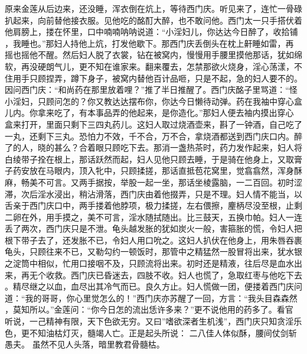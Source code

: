 原来金莲从后边来，还没睡，浑衣倒在炕上，等待西门庆。听见来了，连忙一骨碌
扒起来，向前替他接衣服。见他吃的酩酊大醉，也不敢问他。西门太一只手搭伏着
他肩膀上，搂在怀里，口中喃喃呐呐说道：“小淫妇儿，你达达今日醉了，收拾铺
，我睡也。”那妇人持他上炕，打发他歇下。那西门庆丢倒头在枕上鼾睡如雷，再
摇也摇他不醒。然后妇人脱了衣裳，钻在被窝内，慢慢用手腰里摸他那话，犹如绵
软，再没硬朗气儿，更不知在谁家来。翻来覆去，怎禁那欲火烧身，淫心荡漾，不
住用手只顾捏弄，蹲下身子，被窝内替他百计品咂，只是不起，急的妇人要不的。
因问西门庆：“和尚药在那里放着哩？”推了半日推醒了。西门庆酩子里骂道：“怪
小淫妇，只顾问怎的？你又教达达摆布你，你达今日懒待动弹。药在我袖中穿心盒
儿内。你拿来吃了，有本事品弄的他起来，是你造化。”那妇人便去袖内摸出穿心
盒来打开，里面只剩下三四丸药儿。这妇人取过烧酒壶来，斟了一钟酒，自己吃了
一丸，还剩下三丸。恐怕力不效，千不合，万不合，拿烧酒都送到西门庆口内。醉
了的人，晓的甚么？合着眼只顾吃下去。那消一盏热茶时，药力发作起来，妇人将
白绫带子拴在根上，那话跃然而起，妇人见他只顾去睡，于是骑在他身上，又取膏
子药安放在马眼内，顶入牝中，只顾揉搓，那话直抵苞花窝里，觉翕翕然，浑身酥
麻，畅美不可言。又两手据按，举股一起一坐，那话坐棱露脑，一二百回。初时涩
滞，次后淫水浸出，稍沾滑落，西门庆由着他掇弄，只是不理。妇人情不能当，以
舌亲于西门庆口中，两手搂着他脖项，极力揉搓，左右偎擦，麈柄尽没至根，止剩
二卵在外，用手摸之，美不可言，淫水随拭随出。比三鼓天，五换巾帕。妇人一连
丢了两次，西门庆只是不泄。龟头越发胀的犹如炭火一般，害箍胀的慌，令妇人把
根下带子去了，还发胀不已，令妇人用口吮之。这妇人扒伏在他身上，用朱唇吞裹
龟头，只顾往来不已，又勒勾约一顿饭时，那管中之精猛然一股冒将出来，犹水银
之淀筒中相似，忙用口接咽不及，只顾流将出来。初时还是精液，往后尽是血水出
来，再无个收救。西门庆已昏迷去，四肢不收。妇人也慌了，急取红枣与他吃下去
。精尽继之以血，血尽出其冷气而已。良久方止。妇人慌做一团，便搂着西门庆问
道：“我的哥哥，你心里觉怎么的！”西门庆亦苏醒了一回，方言：“我头目森森然
，莫知所以。”金莲问：“你今日怎的流出恁许多来？”更不说他用的药多了。看官
听说，一己精神有限，天下色欲无穷。又曰”嗜欲深者生机浅”，西门庆只知贪淫乐
色，更不知油枯灯灭，髓竭人亡。正是起头所说：
二八佳人体似酥，腰间仗剑斩愚夫。
虽然不见人头落，暗里教君骨髓枯。

